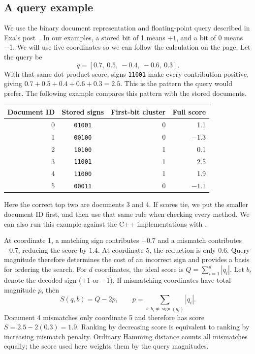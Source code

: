 \subsection{A query example}
We use the binary document representation and floating-point query described in Exa's
post~\cite{exa}. In our examples, a stored bit of 1 means $+1$, and a bit of 0 means $-1$. We will use five coordinates so we can follow
the calculation on the page. Let the query be
\[
q=[0.7,\ 0.5,\ -0.4,\ -0.6,\ 0.3].
\]
With that same dot-product score, signs \texttt{11001} make every contribution positive, giving
$0.7+0.5+0.4+0.6+0.3=2.5$. This is the pattern the query would prefer. The following example compares this pattern with the stored documents.

\begin{center}
\begin{tabular}{@{}rcrr@{}}\toprule
Document ID & Stored signs & First-bit cluster & Full score\\\midrule
0 & \texttt{01001} & 0 & 1.1\\
1 & \texttt{00100} & 0 & $-1.3$\\
2 & \texttt{10100} & 1 & 0.1\\
3 & \texttt{11001} & 1 & 2.5\\
4 & \texttt{11000} & 1 & 1.9\\
5 & \texttt{00011} & 0 & $-1.1$\\\bottomrule
\end{tabular}
\end{center}
Here the correct top two are documents 3 and 4. If scores tie, we put the smaller document ID
first, and then use that same rule when checking every method. We can also run this example
against the C++ implementations with .

At coordinate 1, a matching sign contributes $+0.7$ and a mismatch contributes $-0.7$,
reducing the score by $1.4$. At coordinate 5, the reduction is only $0.6$. Query magnitude
therefore determines the cost of an incorrect sign and provides a basis for ordering the search.
For $d$ coordinates, the ideal score is $Q=\sum_{i=1}^{d}|q_i|$. Let $b_i$ denote the decoded
sign ($+1$ or $-1$). If mismatching coordinates have total magnitude $p$, then
\begin{equation}
S(q,b)=Q-2p,
\qquad p=\sum_{i:\,b_i\ne\operatorname{sign}(q_i)}|q_i|.
\label{eq:score}
\end{equation}
Document 4 mismatches only coordinate 5 and therefore has score $S=2.5-2(0.3)=1.9$.
Ranking by decreasing score is equivalent to ranking by increasing mismatch penalty.
Ordinary Hamming distance counts all mismatches equally; the score used here weights them
by the query magnitudes.

